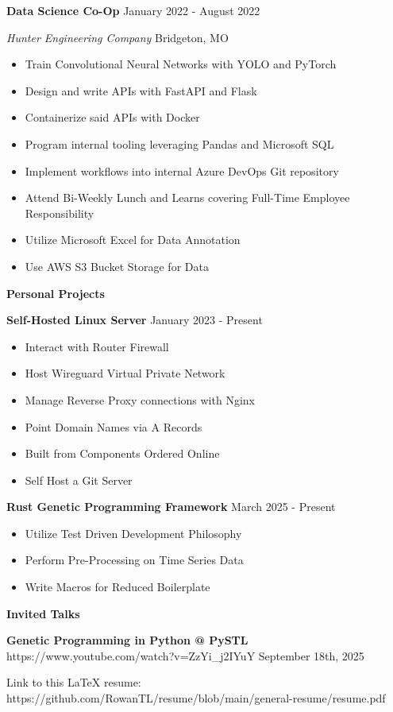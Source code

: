 \documentclass[11pt]{article}
\begin{document}

\textbf{Data Science Co-Op} \hfill January 2022 - August 2022

\textsl{Hunter Engineering Company} \hfill Bridgeton, MO
\begin{itemize}[noitemsep]
    \item Train Convolutional Neural Networks with YOLO and PyTorch
    \item Design and write APIs with FastAPI and Flask
    \item Containerize said APIs with Docker
    \item Program internal tooling leveraging Pandas and Microsoft SQL
    \item Implement workflows into internal Azure DevOps Git repository
    \item Attend Bi-Weekly Lunch and Learns covering Full-Time Employee Responsibility
    \item Utilize Microsoft Excel for Data Annotation
    \item Use AWS S3 Bucket Storage for Data
\end{itemize}


\begin{center}
    \textbf{Personal Projects}
\end{center}

\textbf{Self-Hosted Linux Server} \hfill January 2023 - Present
\begin{itemize}[noitemsep]
    \item Interact with Router Firewall
    \item Host Wireguard Virtual Private Network
    \item Manage Reverse Proxy connections with Nginx
    \item Point Domain Names via A Records
    \item Built from Components Ordered Online
    \item Self Host a Git Server
\end{itemize}

\textbf{Rust Genetic Programming Framework} \hfill March 2025 - Present
\begin{itemize}[noitemsep]
    \item Utilize Test Driven Development Philosophy
    \item Perform Pre-Processing on Time Series Data
    \item Write Macros for Reduced Boilerplate
\end{itemize}

\begin{center}
    \textbf{Invited Talks}
\end{center}

\textbf{Genetic Programming in Python @ PySTL} \tiny{https://www.youtube.com/watch?v=ZzYi\_j2IYuY} \hfill September 18th, 2025

\begin{center}
    \tiny{Link to this LaTeX resume: https://github.com/RowanTL/resume/blob/main/general-resume/resume.pdf}
\end{center}
\end{document}
